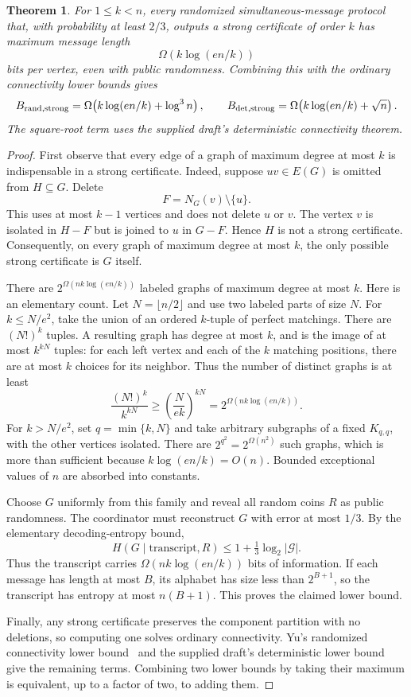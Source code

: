 \documentclass[11pt]{article}
\newtheorem{theorem}{Theorem}[section]
\theoremstyle{remark}\newtheorem{remark}[theorem]{Remark}
\begin{document}
\begin{theorem}\label{thm:certificate-lower}
For $1\le k<n$, every randomized simultaneous-message protocol that, with probability at least $2/3$, outputs a strong certificate of order $k$ has maximum message length
\[
 \Omega\!\left(k\log(en/k)\right)
\]
bits per vertex, even with public randomness. Combining this with the ordinary connectivity lower bounds gives
\[
 B_{\rm rand,strong}=\Omega\!\left(k\log(en/k)+\log^3 n\right),\qquad
 B_{\rm det,strong}=\Omega\!\left(k\log(en/k)+\sqrt n\right).
\]
The square-root term uses the supplied draft's deterministic connectivity theorem.
\end{theorem}
\begin{proof}
First observe that every edge of a graph of maximum degree at most $k$ is indispensable in a strong certificate. Indeed, suppose $uv\in E(G)$ is omitted from $H\subseteq G$. Delete
\[
 F=N_G(v)\setminus\{u\}.
\]
This uses at most $k-1$ vertices and does not delete $u$ or $v$. The vertex $v$ is isolated in $H-F$ but is joined to $u$ in $G-F$. Hence $H$ is not a strong certificate. Consequently, on every graph of maximum degree at most $k$, the only possible strong certificate is $G$ itself.

There are $2^{\Omega(nk\log(en/k))}$ labeled graphs of maximum degree at most $k$. Here is an elementary count. Let $N=\lfloor n/2\rfloor$ and use two labeled parts of size $N$. For $k\le N/e^2$, take the union of an ordered $k$-tuple of perfect matchings. There are $(N!)^k$ tuples. A resulting graph has degree at most $k$, and is the image of at most $k^{kN}$ tuples: for each left vertex and each of the $k$ matching positions, there are at most $k$ choices for its neighbor. Thus the number of distinct graphs is at least
\[
 \frac{(N!)^k}{k^{kN}}
 \ge \left(\frac{N}{ek}\right)^{kN}
 =2^{\Omega(nk\log(en/k))}.
\]
For $k>N/e^2$, set $q=\min\{k,N\}$ and take arbitrary subgraphs of a fixed $K_{q,q}$, with the other vertices isolated. There are $2^{q^2}=2^{\Omega(n^2)}$ such graphs, which is more than sufficient because $k\log(en/k)=O(n)$. Bounded exceptional values of $n$ are absorbed into constants.

Choose $G$ uniformly from this family and reveal all random coins $R$ as public randomness. The coordinator must reconstruct $G$ with error at most $1/3$. By the elementary decoding-entropy bound,
\[
 H(G\mid\text{transcript},R)
 \le 1+\tfrac13\log_2|\mathcal G|.
\]
Thus the transcript carries $\Omega(nk\log(en/k))$ bits of information. If each message has length at most $B$, its alphabet has size less than $2^{B+1}$, so the transcript has entropy at most $n(B+1)$. This proves the claimed lower bound.

Finally, any strong certificate preserves the component partition with no deletions, so computing one solves ordinary connectivity. Yu's randomized connectivity lower bound~\cite{Yu21} and the supplied draft's deterministic lower bound give the remaining terms. Combining two lower bounds by taking their maximum is equivalent, up to a factor of two, to adding them.
\end{proof}
\end{document}
